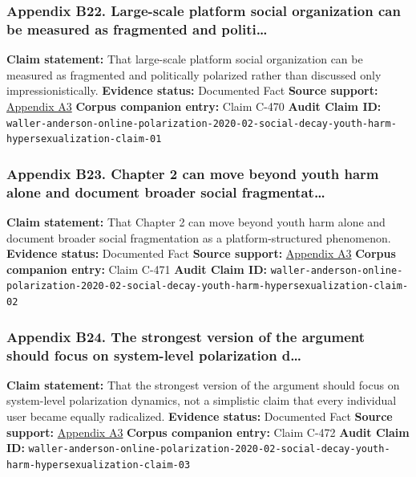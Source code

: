 \documentclass[
  american,
  11pt,
  letterpaper,
]{article}
\begin{document}
\subsubsection{Appendix B22. Large-scale platform social organization
can be measured as fragmented and
politi\ldots{}}\label{appendix-b22-large-scale-platform-social-organization-can-be-measured-as-fragmented-and-politi}

\textbf{Claim statement:} That large-scale platform social organization
can be measured as fragmented and politically polarized rather than
discussed only impressionistically. \textbf{Evidence status:} Documented
Fact \textbf{Source support:}
\hyperref[appendix-a3-quantifying-social-organization-and-political-polarization-in-online-platforms]{Appendix
A3} \textbf{Corpus companion entry:} Claim C-470 \textbf{Audit Claim
ID:}
\texttt{waller-anderson-online-polarization-2020-02-social-decay-youth-harm-hypersexualization-claim-01}

\subsubsection{Appendix B23. Chapter 2 can move beyond youth harm alone
and document broader social
fragmentat\ldots{}}\label{appendix-b23-chapter-2-can-move-beyond-youth-harm-alone-and-document-broader-social-fragmentat}

\textbf{Claim statement:} That Chapter 2 can move beyond youth harm
alone and document broader social fragmentation as a platform-structured
phenomenon. \textbf{Evidence status:} Documented Fact \textbf{Source
support:}
\hyperref[appendix-a3-quantifying-social-organization-and-political-polarization-in-online-platforms]{Appendix
A3} \textbf{Corpus companion entry:} Claim C-471 \textbf{Audit Claim
ID:}
\texttt{waller-anderson-online-polarization-2020-02-social-decay-youth-harm-hypersexualization-claim-02}

\subsubsection{Appendix B24. The strongest version of the argument
should focus on system-level polarization
d\ldots{}}\label{appendix-b24-the-strongest-version-of-the-argument-should-focus-on-system-level-polarization-d}

\textbf{Claim statement:} That the strongest version of the argument
should focus on system-level polarization dynamics, not a simplistic
claim that every individual user became equally radicalized.
\textbf{Evidence status:} Documented Fact \textbf{Source support:}
\hyperref[appendix-a3-quantifying-social-organization-and-political-polarization-in-online-platforms]{Appendix
A3} \textbf{Corpus companion entry:} Claim C-472 \textbf{Audit Claim
ID:}
\texttt{waller-anderson-online-polarization-2020-02-social-decay-youth-harm-hypersexualization-claim-03}
\end{document}
